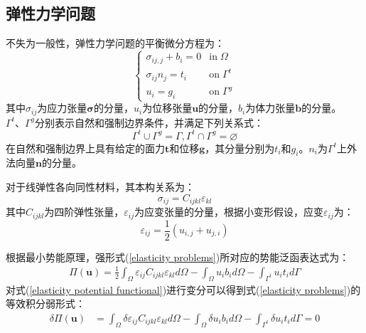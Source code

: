 \subsection{弹性力学问题}
不失为一般性，弹性力学问题的平衡微分方程为：
\begin{equation}\label{elasticity problems}
\begin{cases}
    \sigma_{ij,j}+b_i=0&\text{in}\;\Omega\\
    \sigma_{ij}n_j=t_i&\text{on}\;\Gamma^t\\
    u_i=g_i&\text{on}\;\Gamma^g
\end{cases}
\end{equation}
其中$\sigma_{ij}$为应力张量$\pmb \sigma$的分量，$u_i$为位移张量$\pmb{u}$的分量，$b_i$为体力张量$\pmb{b}$的分量。$\Gamma^t \text{、}\Gamma^g$分别表示自然和强制边界条件，并满足下列关系式：
\begin{equation}
\Gamma^t\cup \Gamma^g=\Gamma,\Gamma^t\cap \Gamma^g=\varnothing
\end{equation}
在自然和强制边界上具有给定的面力$\pmb{t}$和位移$\pmb{g}$，其分量分别为$t_i$和$g_i$。$n_i$为$\Gamma^{t}$上外法向量$\pmb{n}$的分量。\par
对于线弹性各向同性材料，其本构关系为：
\begin{equation}\label{constitutive relation}
    \sigma_{ij}=C_{ijkl}\varepsilon_{kl}
\end{equation}
其中$C_{ijkl}$为四阶弹性张量，$\varepsilon_{ij}$为应变张量的分量，根据小变形假设，应变$\varepsilon_{ij}$为：
\begin{equation}\label{strain}
    \varepsilon_{ij}=\frac{1}{2}(u_{i,j}+u_{j,i})
\end{equation} \par
根据最小势能原理，强形式(\ref{elasticity problems})所对应的势能泛函表达式为：
\begin{equation}\label{elasticity potential functional}
\begin{split}
    \Pi(\pmb{u})=\frac{1}{2}\int_{\Omega}\varepsilon_{ij}C_{ijkl}\varepsilon_{kl}d\Omega-\int_{\Omega}u_ib_id\Omega-\int_{\Gamma^t}u_it_id\Gamma
\end{split}
\end{equation}
对式(\ref{elasticity potential functional})进行变分可以得到式(\ref{elasticity problems})的等效积分弱形式：
\begin{equation}\label{elasticity weak form}
\begin{split}
    \delta\Pi(\pmb{u})&=\int_{\Omega}\delta\varepsilon_{ij}C_{ijkl}\varepsilon_{kl}d\Omega-\int_{\Omega}\delta u_ib_id\Omega-\int_{\Gamma^t}\delta u_it_id\Gamma=0
\end{split}
\end{equation}\par
